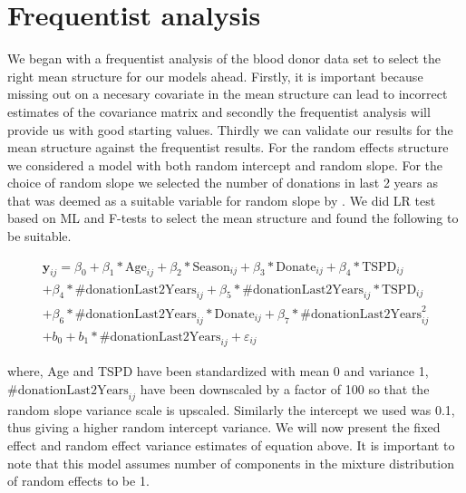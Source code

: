 \section{Frequentist analysis}
\label{sec : frequentist_blood_donor}
We began with a frequentist analysis of the blood donor data set to select the right mean structure for our models ahead. Firstly, it is important because missing out on a necesary covariate in the mean structure can lead to incorrect estimates of the covariance matrix and secondly the frequentist analysis will provide us with good starting values. Thirdly we can validate our results for the mean structure against the frequentist results. For the random effects structure we considered a model with both random intercept and random slope. For the choice of random slope we selected the number of donations in last 2 years as that was deemed as a suitable variable for random slope by \citet{nasserinejad_prevalence_2015}. We did LR test based on ML and F-tests to select the mean structure and found the following to be suitable.

\begin{equation}
\label{eq : blood_donor_model}
\begin{split}
\boldsymbol{y}_{ij} = \beta_0 + \beta_1*\text{Age}_{ij} + \beta_2*\text{Season}_{ij} + \beta_3*\text{Donate}_{ij} + \beta_4*\text{TSPD}_{ij}\\
+ \beta_4*\text{\#donationLast2Years}_{ij} + \beta_5*\text{\#donationLast2Years}_{ij}*\text{TSPD}_{ij}\\
+ \beta_6*\text{\#donationLast2Years}_{ij}*\text{Donate}_{ij} + \beta_7*\text{\#donationLast2Years}_{ij}^2\\
+ b_0 + b_1 * \text{\#donationLast2Years}_{ij} + \varepsilon_{ij}
\end{split}
\end{equation}

where, Age and TSPD have been standardized with mean 0 and variance 1, $\text{\#donationLast2Years}_{ij}$ have been downscaled by a factor of 100 so that the random slope variance scale is upscaled. Similarly the intercept we used was 0.1, thus giving a higher random intercept variance. We will now present the fixed effect and random effect variance estimates of equation above. It is important to note that this model assumes number of components in the mixture distribution of random effects to be 1. 

